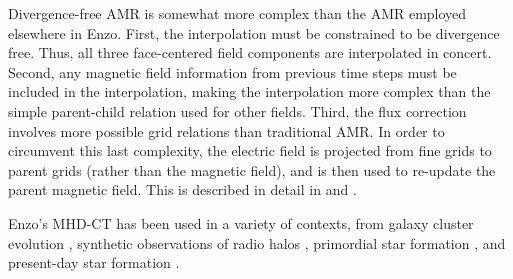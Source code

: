 Divergence-free AMR is somewhat more complex than the AMR employed elsewhere in
Enzo.  First, the interpolation must be constrained to be divergence free.
Thus, all three face-centered field components are interpolated in concert.
Second, any magnetic field information from previous time steps must be included
in the interpolation, making the interpolation more complex than the simple
parent-child relation used for other fields.  Third, the flux correction
involves more possible grid relations than traditional AMR.  In order to
circumvent this last complexity, the electric field is projected from fine grids
to parent grids (rather than the magnetic field), and is then used to re-update
the parent magnetic field.  This is described in detail in
\citet{Balsara99} and \citet{Collins10}.

Enzo's MHD-CT has been used in a variety of contexts, from galaxy cluster
evolution \citep{Xu11,Xu12}, synthetic observations of radio halos
\citep{Skillman13},  primordial star formation \citep{Xu08}, and
present-day star formation \citep{Collins11,Collins12}.  

